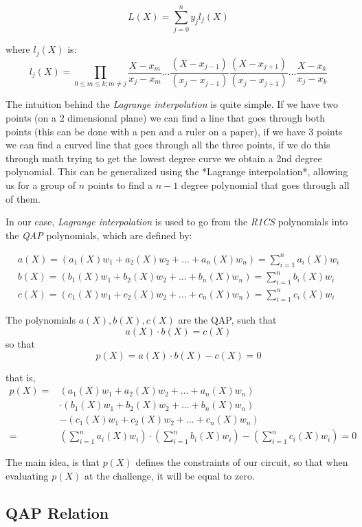\documentclass{article}
\begin{document}
$$L(X) = \sum_{j=0}^{n} y_j l_j(X)$$

where $l_j(X)$ is:
$$
l_j(X) = \prod_{0\leq m \leq k ; m\neq j}
\frac{X-x_m}{x_j - x_m}
...
\frac{(X-x_{j-1})}{(x_j - x_{j-1})}
\frac{(X-x_{j+1})}{(x_j - x_{j+1})}
...
\frac{X-x_k}{x_j - x_k}
$$

The intuition behind the \emph{Lagrange interpolation} is quite simple. If we have two points (on a 2 dimensional plane) we can find a line that goes through both points (this can be done with a pen and a ruler on a paper), if we have 3 points we can find a curved line that goes through all the three points, if we do this through math trying to get the lowest degree curve we obtain a  2nd degree polynomial. This can be generalized using the *Lagrange interpolation*, allowing us for a group of $n$ points to find a $n-1$ degree polynomial that goes through all of them.

In our case, \emph{Lagrange interpolation} is used to go from the \emph{R1CS} polynomials into the \emph{QAP} polynomials, which are defined by:

$$
\begin{aligned}
    a(X) = (a_1(X)w_1 + a_2(X)w_2 + ... + a_n(X)w_n) = \sum_{i=1}^n a_i(X) w_i\\
    b(X) = (b_1(X)w_1 + b_2(X)w_2 + ... + b_n(X)w_n) = \sum_{i=1}^n b_i(X) w_i\\
    c(X) = (c_1(X)w_1 + c_2(X)w_2 + ... + c_n(X)w_n) = \sum_{i=1}^n c_i(X) w_i
\end{aligned}
$$

The polynomials $a(X), b(X), c(X)$ are the QAP, such that
$$a(X) \cdot b(X) = c(X)$$
so that
$$p(X) = a(X) \cdot b(X) - c(X) = 0$$

that is,
$$
\begin{aligned}
    p(X) = &(a_1(X)w_1 + a_2(X)w_2 + ... + a_n(X)w_n)\\
	 &\cdot (b_1(X)w_1 + b_2(X)w_2 + ... + b_n(X)w_n)\\
	 &- (c_1(X)w_1 + c_2(X)w_2 + ... + c_n(X)w_n)\\
    = &(\sum_{i=1}^n a_i(X) w_i) \cdot (\sum_{i=1}^n b_i(X) w_i) - (\sum_{i=1}^n c_i(X) w_i) = 0
\end{aligned}
$$

The main idea, is that $p(X)$ defines the constraints of our circuit, so that when evaluating $p(X)$ at the challenge, it will be equal to zero.


\vspace{0.5cm}

\subsection{QAP Relation} \label{qap-relation}
\end{document}
